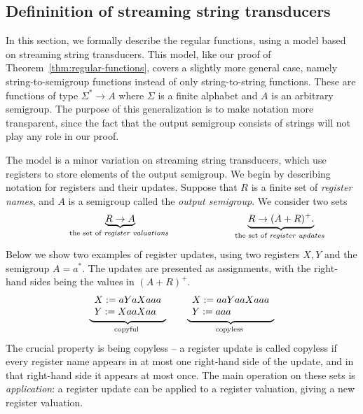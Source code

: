 \subsection{Defininition of streaming string transducers}
\label{sec:sst-definition}
In this section, we formally describe the regular functions, using a model based on streaming string transducers.  This model, like our proof of Theorem~\ref{thm:regular-functions}, covers a slightly more general case, namely string-to-semigroup functions instead of only string-to-string functions. These are functions of type $\Sigma^* \to A$ where $\Sigma$ is a finite alphabet and $A$ is an arbitrary semigroup.  The purpose of this generalization is to make notation more transparent, since the fact that the output semigroup consists of strings will not play any role in our proof.

The model is a minor variation on streaming string transducers, which use registers to store elements of the output semigroup. We begin by describing notation for registers and their updates. Suppose that $R$ is a finite set of \emph{register names}, and $A$ is a semigroup called the \emph{output semigroup}. We consider two sets 
\begin{align*}
\hspace{2cm}
    \myunderbrace{R \to A}{the set of \emph{register valuations}} 
    \hspace{4cm}
    \myunderbrace{R \to (A+R)^+.}{the set of \emph{register updates}}
\end{align*}
Below we show two examples of register updates, using two registers $X,Y$ and the semigroup $A = a^*$.  The updates are presented as assignments, with the right-hand sides being the values in $(A+R)^+$.
\begin{align*}
    \myunderbrace{
    \begin{array}{l}
        X:= aYaXaaa\\
    Y:= XaaXaa
    \end{array}
    }{copyful}
    \qquad 
    \myunderbrace{
    \begin{array}{l}
        X:= aaYaaXaaa\\
    Y:= aaa
    \end{array}
    }{copyless}
    \end{align*}
The crucial property is being copyless -- a register update is called copyless if every register name appears in at most one right-hand side of the update, and in that right-hand side it appears at most once. 
The main operation on these sets is \emph{application}: a register update can be applied to a register valuation, giving a new register valuation. 


